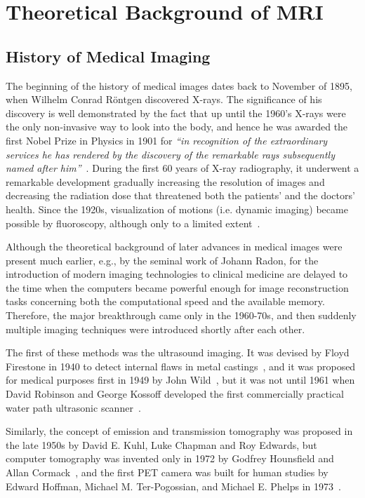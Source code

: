 \chapter{Theoretical Background of MRI}

\section{History of Medical Imaging}
The beginning of the history of medical images dates back to November of 1895, when Wilhelm Conrad Röntgen discovered X-rays. The significance of his discovery is well demonstrated by the fact that up until the 1960's X-rays were the only non-invasive way to look into the body, and hence he was awarded the first Nobel Prize in Physics in 1901 for \emph{``in recognition of the extraordinary services he has rendered by the discovery of the remarkable rays subsequently named after him''}~\cite{nobelprize_1901}. During the first 60 years of X-ray radiography, it underwent a remarkable development gradually increasing the resolution of images and decreasing the radiation dose that threatened both the patients' and the doctors' health. Since the 1920s, visualization of motions (i.e. dynamic imaging) became possible by fluoroscopy, although only to a limited extent~\cite{bradley_history_2008}.

Although the theoretical background of later advances in medical images were present much earlier, e.g., by the seminal work of Johann Radon, for the introduction of modern imaging technologies to clinical medicine are delayed to the time when the computers became powerful enough for image reconstruction tasks concerning both the computational speed and the available memory. Therefore, the major breakthrough came only in the 1960-70s, and then suddenly multiple imaging techniques were introduced shortly after each other.

The first of these methods was the ultrasound imaging. It was devised by Floyd Firestone in 1940 to detect internal flaws in metal castings~\cite{singh_origin_2007}, and it was proposed for medical purposes first in 1949 by John Wild~\cite{watts_john_2009}, but it was not until 1961 when David Robinson and George Kossoff developed the first commercially practical water path ultrasonic scanner~\cite{griffiths_historical_nodate}.

Similarly, the concept of emission and transmission tomography was proposed in the late 1950s by David E. Kuhl, Luke Chapman and Roy Edwards, but computer tomography was invented only in 1972 by Godfrey Hounsfield and Allan Cormack~\cite{richmond_sir_2004}, and the first PET camera was built for human studies by Edward Hoffman, Michael M. Ter-Pogossian, and Michael E. Phelps in 1973~\cite{noauthor_us_nodate}.

